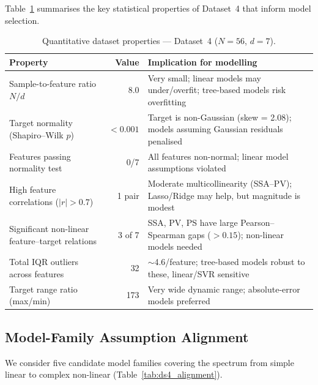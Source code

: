 \documentclass[12pt,a4paper]{article}
\begin{document}
Table~\ref{tab:ds4_characteristics} summarises the key statistical
properties of Dataset~4 that inform model selection.

\begin{table}[h]
\centering
\caption{Quantitative dataset properties — Dataset~4 ($N=56$, $d=7$).}
\label{tab:ds4_characteristics}
\small
\begin{tabular}{p{5.5cm}r p{7cm}}
\toprule
Property & Value & Implication for modelling \\
\midrule
Sample-to-feature ratio $N/d$ & 8.0 & Very small; linear models may under/overfit; tree-based models risk overfitting \\
Target normality (Shapiro--Wilk $p$) & $< 0.001$ & Target is non-Gaussian (skew = 2.08); models assuming Gaussian residuals penalised \\
Features passing normality test & 0/7 & All features non-normal; linear model assumptions violated \\
High feature correlations ($|r|>0.7$) & 1 pair & Moderate multicollinearity (SSA--PV); Lasso/Ridge may help, but magnitude is modest \\
Significant non-linear feature--target relations & 3 of 7 & SSA, PV, PS have large Pearson--Spearman gaps ($> 0.15$); non-linear models needed \\
Total IQR outliers across features & 32 & $\sim$4.6/feature; tree-based models robust to these, linear/SVR sensitive \\
Target range ratio (max/min) & 173 & Very wide dynamic range; absolute-error models preferred \\
\bottomrule
\end{tabular}
\end{table}

\subsection{Model-Family Assumption Alignment}

We consider five candidate model families covering the spectrum from
simple linear to complex non-linear (Table~\ref{tab:ds4_alignment}).
\end{document}
